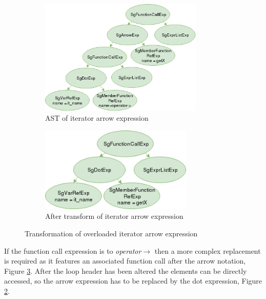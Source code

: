 \documentclass[bsc,frontabs,singlespacing,twoside,parskip,deptreport]{infthesis}
\begin{document}
\begin{figure}[H]
    \begin{subfigure}[b]{0.5\textwidth}
        \centering
            \includegraphics[height=5.5cm]{images/iterator-arrow-replace-ast.png}
        \caption{AST of iterator arrow expression}
        \label{fig:iter-AST-Trans-arrow-before}
    \end{subfigure}
    \hfill
    \begin{subfigure}[b]{0.5\textwidth}
        \centering
            \includegraphics[width=0.8\textwidth]{images/iterator-arrow-replace-ast-after.png}
        \caption{After transform of iterator arrow expression}
        \label{fig:iter-AST-Trans-arrow-after}
    \end{subfigure}
    \vspace{-0.5cm}
    \caption{Transformation of overloaded iterator arrow expression}
    \label{fig:iter-arrow-use-trans}
\end{figure}

If the function call expression is to \textit{operator$\rightarrow$} then a more complex replacement is required as it features an associated function call after the arrow notation, Figure \ref{fig:iter-arrow-use-trans}. After the loop header has been altered the elements can be directly accessed, so the arrow expression has to be replaced by the dot expression, Figure \ref{fig:iter-AST-Trans-arrow-after}. 
\end{document}
